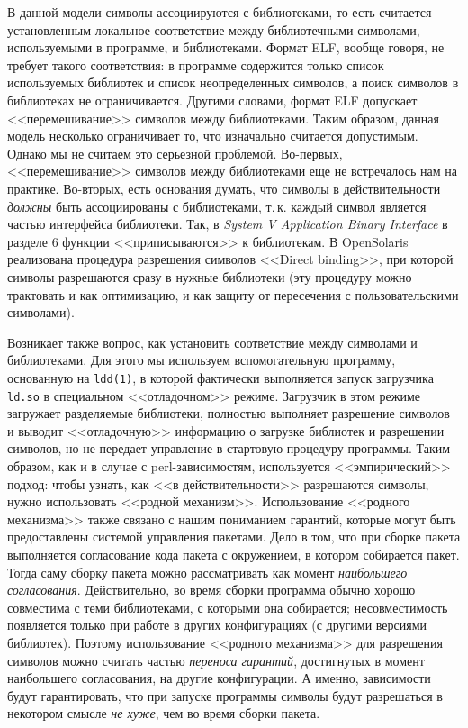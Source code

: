 \documentclass[russian,a4paper,12pt,titlepage]{article}
\begin{document}
В данной модели символы ассоциируются с библиотеками, то есть считается установленным локальное соответствие между
библиотечными символами, используемыми в программе, и библиотеками.  Формат ELF, вообще говоря, не требует такого соответствия:
в программе содержится только список используемых библиотек и список неопределенных символов, а поиск символов в библиотеках
не ограничивается.  Другими словами, формат ELF допускает <<перемешивание>> символов между библиотеками.  Таким образом,
данная модель несколько ограничивает то, что изначально считается допустимым.  Однако мы не считаем это серьезной проблемой.
Во-первых, <<перемешивание>> символов между библиотеками еще не встречалось нам на практике.  Во-вторых, есть основания думать,
что символы в действительности \emph{должны} быть ассоциированы с библиотеками, т.\,к. каждый символ является частью интерфейса
библиотеки.  Так, в \textsl{System V Application Binary Interface} в разделе 6 функции <<приписываются>> к библиотекам.
В OpenSolaris реализована процедура разрешения символов <<Direct binding>>, при которой символы разрешаются сразу
в нужные библиотеки (эту процедуру можно трактовать и как оптимизацию, и как защиту от пересечения с пользовательскими символами).

Возникает также вопрос, как установить соответствие между символами и библиотеками.  Для этого мы используем вспомогательную
программу, основанную на \verb|ldd(1)|, в которой фактически выполняется запуск загрузчика \verb|ld.so| в специальном <<отладочном>>
режиме.  Загрузчик в этом режиме загружает разделяемые библиотеки, полностью выполняет разрешение символов и выводит <<отладочную>>
информацию о загрузке библиотек и разрешении символов, но не передает управление в стартовую процедуру программы.  Таким образом,
как и в случае с perl-зависимостям, используется <<эмпирический>> подход: чтобы узнать, как <<в действительности>> разрешаются символы,
нужно использовать <<родной механизм>>.  Использование <<родного механизма>> также связано с нашим пониманием гарантий, которые
могут быть предоставлены системой управления пакетами.  Дело в том, что при сборке пакета выполняется согласование кода пакета
с окружением, в котором собирается пакет.  Тогда саму сборку пакета можно рассматривать как момент \emph{наибольшего согласования}.
Действительно, во время сборки программа обычно хорошо совместима с теми библиотеками, с которыми она собирается; несовместимость
появляется только при работе в других конфигурациях (с другими версиями библиотек).  Поэтому использование <<родного механизма>>
для разрешения символов можно считать частью \emph{переноса гарантий}, достигнутых в момент наибольшего согласования, на другие
конфигурации.  А именно, зависимости будут гарантировать, что при запуске программы символы будут разрешаться в некотором смысле
\emph{не хуже}, чем во время сборки пакета.
\end{document}
